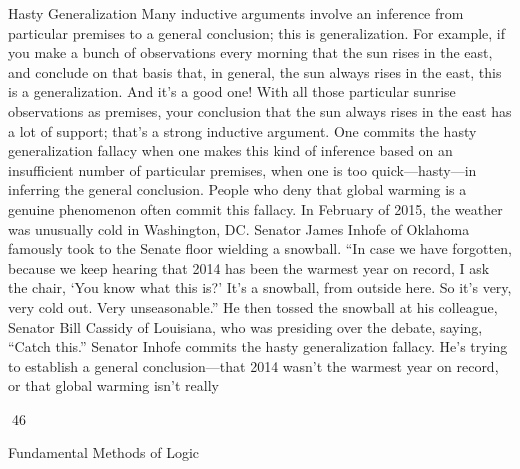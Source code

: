 Hasty Generalization
Many inductive arguments involve an inference from particular premises to a general conclusion;
this is generalization. For example, if you make a bunch of observations every morning that the
sun rises in the east, and conclude on that basis that, in general, the sun always rises in the east,
this is a generalization. And it’s a good one! With all those particular sunrise observations as
premises, your conclusion that the sun always rises in the east has a lot of support; that’s a strong
inductive argument.
One commits the hasty generalization fallacy when one makes this kind of inference based on an
insufficient number of particular premises, when one is too quick—hasty—in inferring the general
conclusion.
People who deny that global warming is a genuine phenomenon often commit this fallacy. In
February of 2015, the weather was unusually cold in Washington, DC. Senator James Inhofe of
Oklahoma famously took to the Senate floor wielding a snowball. “In case we have forgotten,
because we keep hearing that 2014 has been the warmest year on record, I ask the chair, ‘You
know what this is?’ It’s a snowball, from outside here. So it’s very, very cold out. Very
unseasonable.” He then tossed the snowball at his colleague, Senator Bill Cassidy of Louisiana,
who was presiding over the debate, saying, “Catch this.”
Senator Inhofe commits the hasty generalization fallacy. He’s trying to establish a general
conclusion—that 2014 wasn’t the warmest year on record, or that global warming isn’t really

46

Fundamental Methods of Logic

